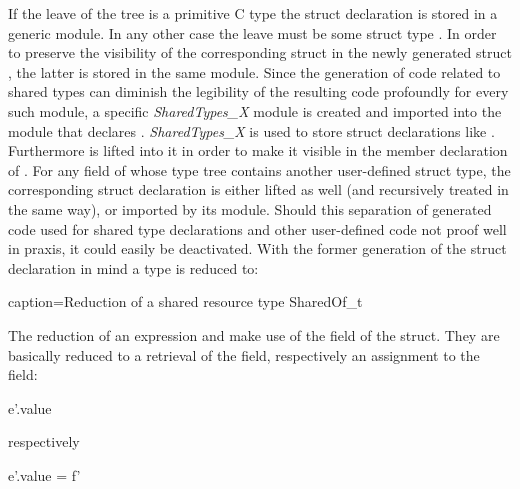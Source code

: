 \vspace{4mm}
If the leave of the tree is a primitive C type the struct declaration is stored in a generic module. In any other case the leave must be some struct type . In order to preserve the visibility of the corresponding struct in the newly generated struct , the latter is stored in the same module. Since the generation of code related to shared types can diminish the legibility of the resulting code profoundly for every such module, a specific \textit{SharedTypes\_X} module is created and imported into the module that declares . \textit{SharedTypes\_X} is used to store struct declarations like . Furthermore  is lifted into it in order to make it visible in the member declaration  of . For any field of  whose type tree contains another user-defined struct type, the corresponding struct declaration is either lifted as well (and recursively treated in the same way), or imported by its module. Should this separation of generated code used for shared type declarations and other user-defined code not proof well in praxis, it could easily be deactivated.
With the former generation of the struct declaration in mind a type  is reduced to:
\begin{ccode}{caption=Reduction of a shared resource type}
SharedOf_t
\end{ccode}
The reduction of an expression  and  make use of the  field of the  struct. They are basically reduced to a retrieval of the field, respectively an assignment to the field:

\vspace{4mm}
\begin{minipage}{1\textwidth}
\begin{minipage}{0.1\textwidth}
\begin{ccode}{}
e'.value
\end{ccode}
\end{minipage}
\begin{minipage}{0.22\textwidth}
\qquad respectively
\end{minipage}
\begin{minipage}{0.15\textwidth}
\begin{ccode}{}
e'.value = f'
\end{ccode}
\end{minipage}
\end{minipage}
\vspace{0mm}


